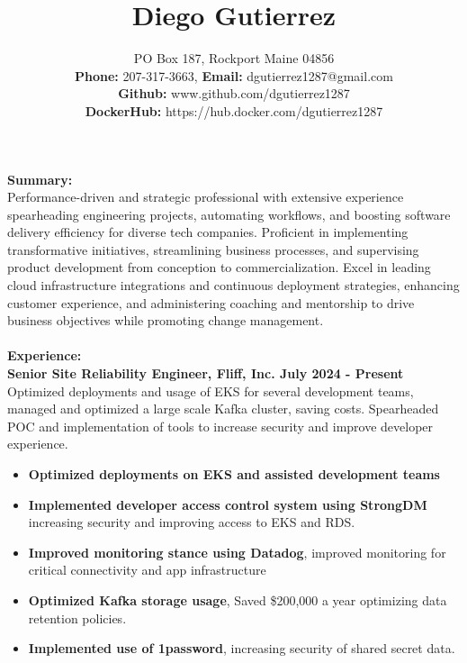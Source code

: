 \documentclass[10pt]{article}
\title{Diego Gutierrez}
\date{}
\author{%
	PO Box 187, Rockport Maine 04856\\
	\textbf{Phone:} 207-317-3663, \textbf{Email:} dgutierrez1287@gmail.com\\
	\textbf{Github:} www.github.com/dgutierrez1287\\
	\textbf{DockerHub:} https://hub.docker.com/dgutierrez1287
}
\makeatletter
\renewcommand{\maketitle}{\bgroup\setlength{\parindent}{0pt}
	\begin{flushleft}
		\LARGE\textbf{\@title}
		
		\normalsize\@author
	\end{flushleft}\egroup
}
\makeatother
\begin{document}
\maketitle
\thispagestyle{empty} %
\noindent\Large\textbf{Summary:}\\
\normalsize Performance-driven and strategic professional with extensive experience spearheading engineering projects, 
automating workflows, and boosting software delivery efficiency for diverse tech companies. Proficient in implementing transformative initiatives, 
streamlining business processes, and supervising product development from conception to commercialization. Excel in leading cloud infrastructure 
integrations and continuous deployment strategies, enhancing customer experience, and administering coaching and mentorship to drive business 
objectives while promoting change management.
\\
\\
\noindent\Large\textbf{Experience:}\\
\normalsize
\textbf{Senior Site Reliability Engineer, Fliff, Inc. \hfill{July 2024 - Present}}
\normalsize Optimized deployments and usage of EKS for several development teams, managed and optimized a large scale Kafka
cluster, saving costs. Spearheaded POC and implementation of tools to increase security and improve developer experience.
\begin{itemize}
\small
\item \textbf{Optimized deployments on EKS and assisted development teams}
\item \textbf{Implemented developer access control system using StrongDM} increasing security and improving access to EKS and RDS.
\item \textbf{Improved monitoring stance using Datadog}, improved monitoring for critical connectivity and app infrastructure
\item \textbf{Optimized Kafka storage usage}, Saved \$200,000 a year optimizing data retention policies.
\item \textbf{Implemented use of 1password}, increasing security of shared secret data.
\end{itemize}
\end{document}
